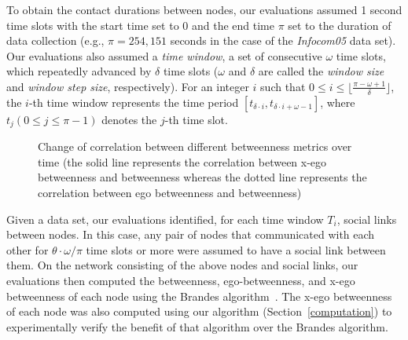 To obtain the contact durations between nodes, our evaluations assumed 1 second time slots with the start time set to 0 and the end time $\pi$ set to the duration of data collection (e.g., $\pi = 254{,}151$ seconds in the case of the {\em Infocom05} data set).
Our evaluations also assumed a {\em time window}, a set of consecutive $\omega$ time slots, which repeatedly advanced by $\delta$ time slots ($\omega$ and $\delta$ are called the {\em window size} and {\em window step size}, respectively).
For an integer $i$ such that $0 \leq i \leq \lfloor\frac{\pi - \omega + 1}{\delta}\rfloor$, the $i$-th time window represents the time period $[t_{\delta \cdot i}, t_{\delta \cdot i + \omega - 1}]$, where $t_{j} (0 \le j \le \pi - 1)$ denotes the $j$-th time slot.
\begin{figure}[t] 
\centering 
{}
\caption{Change of correlation between different betweenness metrics over time (the solid line represents the correlation between x-ego betweenness and betweenness whereas the dotted line represents the correlation between ego betweenness and betweenness)}
\label{correlation_gap}
\end{figure} 
Given a data set, our evaluations identified, for each time window $T_i$, social links between nodes.
In this case, any pair of nodes that communicated with each other for $\theta \cdot \omega / \pi$ time slots or more were assumed to have a social link between them.
On the network consisting of the above nodes and social links, our evaluations then computed the betweenness, ego-betweenness, and x-ego betweenness of each node using the Brandes algorithm~\cite{Brandes01afaster}.
The x-ego betweenness of each node was also computed using our algorithm (Section~\ref{computation}) to experimentally verify the benefit of that algorithm over the Brandes algorithm.

